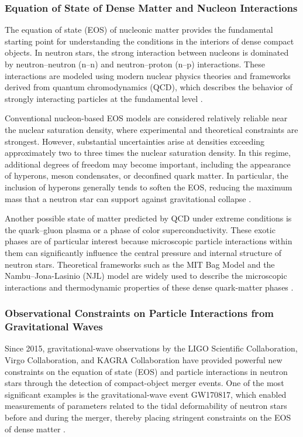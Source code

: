 \subsubsection{Equation of State of Dense Matter and Nucleon Interactions}

The equation of state (EOS) of nucleonic matter provides the fundamental starting point for understanding the conditions in the interiors of dense compact objects. In neutron stars, the strong interaction between nucleons is dominated by neutron--neutron (n--n) and neutron--proton (n--p) interactions. These interactions are modeled using modern nuclear physics theories and frameworks derived from quantum chromodynamics (QCD), which describes the behavior of strongly interacting particles at the fundamental level \cite{akmal1998,gandolfi2012}.

Conventional nucleon-based EOS models are considered relatively reliable near the nuclear saturation density, where experimental and theoretical constraints are strongest. However, substantial uncertainties arise at densities exceeding approximately two to three times the nuclear saturation density. In this regime, additional degrees of freedom may become important, including the appearance of hyperons, meson condensates, or deconfined quark matter. In particular, the inclusion of hyperons generally tends to soften the EOS, reducing the maximum mass that a neutron star can support against gravitational collapse \cite{schaffner2008}.

Another possible state of matter predicted by QCD under extreme conditions is the quark--gluon plasma or a phase of color superconductivity. These exotic phases are of particular interest because microscopic particle interactions within them can significantly influence the central pressure and internal structure of neutron stars. Theoretical frameworks such as the MIT Bag Model and the Nambu--Jona-Lasinio (NJL) model are widely used to describe the microscopic interactions and thermodynamic properties of these dense quark-matter phases \cite{alford2008,fukushima2011}.

\subsubsection{Observational Constraints on Particle Interactions from Gravitational Waves}

Since 2015, gravitational-wave observations by the LIGO Scientific Collaboration, Virgo Collaboration, and KAGRA Collaboration have provided powerful new constraints on the equation of state (EOS) and particle interactions in neutron stars through the detection of compact-object merger events. One of the most significant examples is the gravitational-wave event GW170817, which enabled measurements of parameters related to the tidal deformability of neutron stars before and during the merger, thereby placing stringent constraints on the EOS of dense matter \cite{abbott2017,tews2018}.

